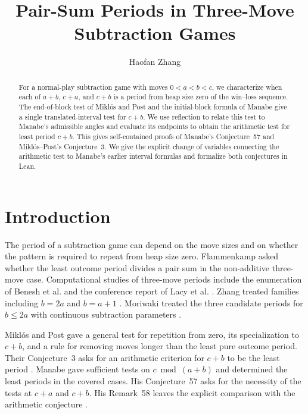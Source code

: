 \documentclass[11pt]{article}
\title{Pair-Sum Periods in Three-Move Subtraction Games}
\author{Haofan Zhang}
\date{}
\begin{document}
\maketitle
\vspace{-.8em}

\begin{abstract}
For a normal-play subtraction game with moves $0<a<b<c$, we characterize
when each of $a+b$, $c+a$, and $c+b$ is a period from heap size zero of the
win--loss sequence. The end-of-block test of Mikl\'os and Post and the
initial-block formula of Manabe give a single translated-interval test for
$c+b$. We use reflection to relate this test to Manabe's admissible
angles and evaluate its endpoints to obtain the arithmetic test for
least period $c+b$. This gives self-contained proofs of Manabe's
Conjecture~57 and Mikl\'os--Post's Conjecture~3. We give the explicit
change of variables connecting the arithmetic test to Manabe's earlier
interval formulas and formalize both conjectures in Lean.
\end{abstract}

\section{Introduction}

The period of a subtraction game can depend on the move sizes and on
whether the pattern is required to repeat from heap size zero.
Flammenkamp \cite[Conjecture~6]{flammenkamp} asked whether the least
outcome period divides a pair sum in the non-additive three-move case.
Computational studies of three-move periods include the enumeration of
Benesh et al. \cite{benesh} and the conference report of Lacy et al.
\cite{lacy}. Zhang treated families including $b=2a$ and $b=a+1$
\cite[Propositions~3.1 and~4.1]{zhang}. Moriwaki treated the three
candidate periods for $b\le 2a$ with continuous subtraction parameters
\cite[Theorem~3]{moriwaki}.

Mikl\'os and Post gave a general test for repetition from zero, its
specialization to $c+b$, and a rule for removing moves longer than the
least pure outcome period. Their Conjecture~3 asks for an arithmetic
criterion for $c+b$ to be the least period
\cite[Proposition~7, Lemma~9, Corollary~9.1, and Conjecture~3]{miklos-post}.
Manabe gave sufficient tests on $c\bmod(a+b)$ and determined the
least periods in the covered cases. His Conjecture~57 asks for the
necessity of the tests at $c+a$ and $c+b$. His Remark~58 leaves the
explicit comparison with the arithmetic conjecture
\cite[Theorems~23 and~34, Conjecture~57, and Remark~58]{manabe}.
\end{document}
